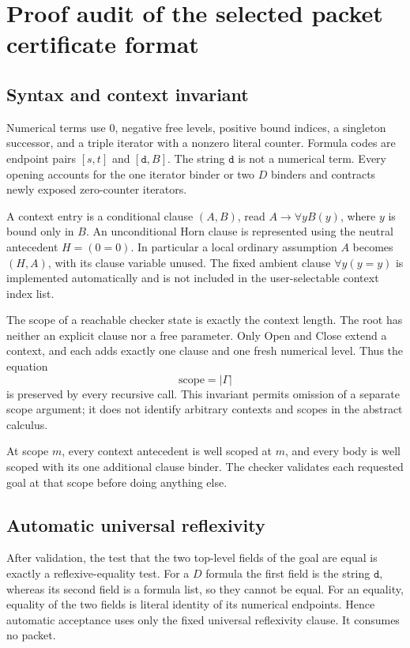 \section{Proof audit of the selected packet certificate format}

\subsection{Syntax and context invariant}
Numerical terms use \(0\), negative free levels, positive bound indices,
a singleton successor, and a triple iterator with a nonzero literal
counter. Formula codes are endpoint pairs \([s,t]\) and
\([\mathtt d,B]\). The string \(\mathtt d\) is not a numerical term.
Every opening accounts for the one iterator binder or two \(D\)
binders and contracts newly exposed zero-counter iterators.

A context entry is a conditional clause \((A,B)\), read
\(A\to\forall yB(y)\), where \(y\) is bound only in \(B\).
An unconditional Horn clause is represented using the neutral antecedent
\(H=(0=0)\). In particular a local ordinary assumption \(A\) becomes
\((H,A)\), with its clause variable unused. The fixed ambient clause
\(\forall y(y=y)\) is implemented automatically and is not included in
the user-selectable context index list.

The scope of a reachable checker state is exactly the context length.
The root has neither an explicit clause nor a free parameter.
Only Open and Close extend a context, and each adds exactly one clause
and one fresh numerical level. Thus the equation
\[
 \mathrm{scope}=|\Gamma|
\]
is preserved by every recursive call. This invariant permits omission
of a separate scope argument; it does not identify arbitrary contexts
and scopes in the abstract calculus.

At scope \(m\), every context antecedent is well scoped at \(m\), and
every body is well scoped with its one additional clause binder.
The checker validates each requested goal at that scope before doing
anything else.

\subsection{Automatic universal reflexivity}
After validation, the test that the two top-level fields of the goal
are equal is exactly a reflexive-equality test. For a \(D\) formula the
first field is the string \(\mathtt d\), whereas its second field is a
formula list, so they cannot be equal. For an equality, equality of the
two fields is literal identity of its numerical endpoints.
Hence automatic acceptance uses only the fixed universal reflexivity
clause. It consumes no packet.

